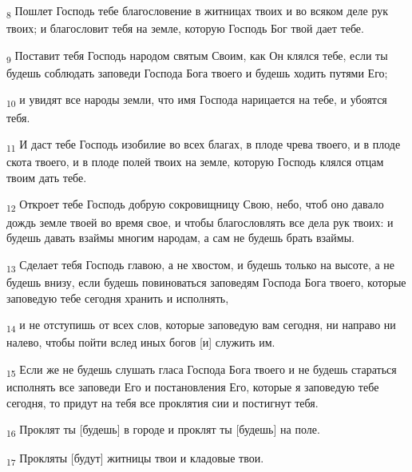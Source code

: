 \begin{tcolorbox}
\textsubscript{8} Пошлет Господь тебе благословение в житницах твоих и во всяком деле рук твоих; и благословит тебя на земле, которую Господь Бог твой дает тебе.
\end{tcolorbox}
\begin{tcolorbox}
\textsubscript{9} Поставит тебя Господь народом святым Своим, как Он клялся тебе, если ты будешь соблюдать заповеди Господа Бога твоего и будешь ходить путями Его;
\end{tcolorbox}
\begin{tcolorbox}
\textsubscript{10} и увидят все народы земли, что имя Господа нарицается на тебе, и убоятся тебя.
\end{tcolorbox}
\begin{tcolorbox}
\textsubscript{11} И даст тебе Господь изобилие во всех благах, в плоде чрева твоего, и в плоде скота твоего, и в плоде полей твоих на земле, которую Господь клялся отцам твоим дать тебе.
\end{tcolorbox}
\begin{tcolorbox}
\textsubscript{12} Откроет тебе Господь добрую сокровищницу Свою, небо, чтоб оно давало дождь земле твоей во время свое, и чтобы благословлять все дела рук твоих: и будешь давать взаймы многим народам, а сам не будешь брать взаймы.
\end{tcolorbox}
\begin{tcolorbox}
\textsubscript{13} Сделает тебя Господь главою, а не хвостом, и будешь только на высоте, а не будешь внизу, если будешь повиноваться заповедям Господа Бога твоего, которые заповедую тебе сегодня хранить и исполнять,
\end{tcolorbox}
\begin{tcolorbox}
\textsubscript{14} и не отступишь от всех слов, которые заповедую вам сегодня, ни направо ни налево, чтобы пойти вслед иных богов [и] служить им.
\end{tcolorbox}
\begin{tcolorbox}
\textsubscript{15} Если же не будешь слушать гласа Господа Бога твоего и не будешь стараться исполнять все заповеди Его и постановления Его, которые я заповедую тебе сегодня, то придут на тебя все проклятия сии и постигнут тебя.
\end{tcolorbox}
\begin{tcolorbox}
\textsubscript{16} Проклят ты [будешь] в городе и проклят ты [будешь] на поле.
\end{tcolorbox}
\begin{tcolorbox}
\textsubscript{17} Прокляты [будут] житницы твои и кладовые твои.
\end{tcolorbox}
